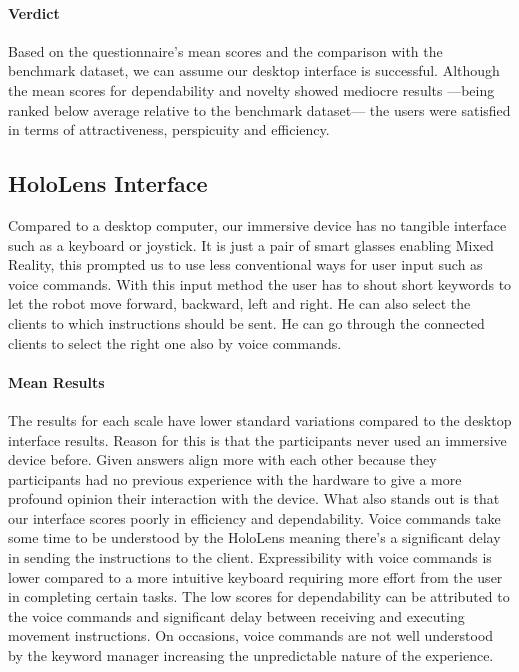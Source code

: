 \paragraph{Verdict}
Based on the questionnaire's mean scores and the comparison with the benchmark dataset, we can assume our desktop interface is successful. Although the mean scores for dependability and novelty showed mediocre results ---being ranked below average relative to the benchmark dataset--- the users were satisfied in terms of attractiveness, perspicuity and efficiency.

\subsection{HoloLens Interface}
Compared to a desktop computer, our immersive device has no tangible interface such as a keyboard or joystick. It is just a pair of smart glasses enabling Mixed Reality, this prompted us to use less conventional ways for user input such as voice commands. With this input method the user has to shout short keywords to let the robot move forward, backward, left and right. He can also select the clients to which instructions should be sent. He can go through the connected clients to select the right one also by voice commands.

\paragraph{Mean Results}
The results for each scale have lower standard variations compared to the desktop interface results. Reason for this is that the participants never used an immersive device before. Given answers align more with each other because they participants had no previous experience with the hardware to give a more profound opinion their interaction with the device.
What also stands out is that our interface scores poorly in efficiency and dependability. Voice commands take some time to be understood by the HoloLens meaning there's a significant delay in sending the instructions to the client. Expressibility with voice commands is lower compared to a more intuitive keyboard requiring more effort from the user in completing certain tasks.
The low scores for dependability can be attributed to the voice commands and significant delay between receiving and executing movement instructions.
On occasions, voice commands are not well understood by the keyword manager increasing the unpredictable nature of the experience.

